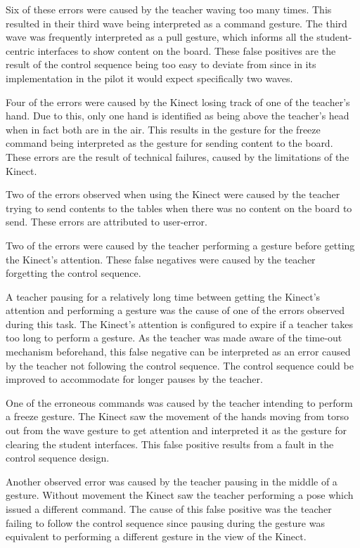 \documentclass[link]{IWCOMP}
\begin{document}
Six of these errors were caused by the teacher waving too many times.
This resulted in their third wave being interpreted as a command gesture.
The third wave was frequently interpreted as a pull gesture, which informs all the student-centric interfaces to show content on the board.
These false positives are the result of the control sequence being too easy to deviate from since in its implementation in the pilot it would expect specifically two waves.

Four of the errors were caused by the Kinect losing track of one of the teacher's hand.
Due to this, only one hand is identified as being above the teacher's head when in fact both are in the air.
This results in the gesture for the freeze command being interpreted as the gesture for sending content to the board.
These errors are the result of technical failures, caused by the limitations of the Kinect.

Two of the errors observed when using the Kinect were caused by the teacher trying to send contents to the tables when there was no content on the board to send.
These errors are attributed to user-error.

Two of the errors were caused by the teacher performing a gesture before getting the Kinect's attention.
These false negatives were caused by the teacher forgetting the control sequence.

A teacher pausing for a relatively long time between getting the Kinect's attention and performing a gesture was the cause of one of the errors observed during this task.
The Kinect's attention is configured to expire if a teacher takes too long to perform a gesture.
As the teacher was made aware of the time-out mechanism beforehand, this false negative can be interpreted as an error caused by the teacher not following the control sequence.
The control sequence could be improved to accommodate for longer pauses by the teacher.

One of the erroneous commands was caused by the teacher intending to perform a freeze gesture.
The Kinect saw the movement of the hands moving from torso out from the wave gesture to get attention and interpreted it as the gesture for clearing the student interfaces.
This false positive results from a fault in the control sequence design.

Another observed error was caused by the teacher pausing in the middle of a gesture.
Without movement the Kinect saw the teacher performing a pose which issued a different command.
The cause of this false positive was the teacher failing to follow the control sequence since pausing during the gesture was equivalent to performing a different gesture in the view of the Kinect.
\end{document}
